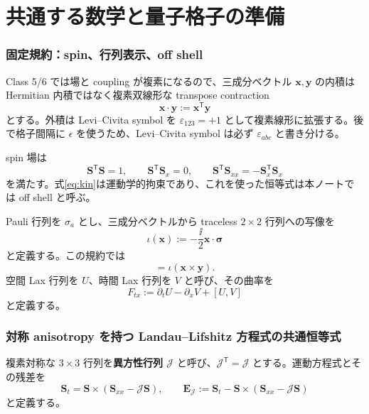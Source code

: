 \part{共通する数学と量子格子の準備}

\section{固定規約：spin、行列表示、off shell}
Class 5/6 では場と coupling が複素になるので、三成分ベクトル $\boldsymbol x,\boldsymbol y$ の内積は Hermitian 内積ではなく複素双線形な transpose contraction
\begin{equation}
\boldsymbol x\cdot\boldsymbol y:=\boldsymbol x^{\mathsf T}\boldsymbol y
\label{eq:dot}
\end{equation}
とする。外積は Levi--Civita symbol を $\varepsilon_{123}=+1$ として複素線形に拡張する。後で格子間隔に $\epsilon$ を使うため、Levi--Civita symbol は必ず $\varepsilon_{abc}$ と書き分ける。

spin 場は
\begin{equation}
\boldsymbol S^{\mathsf T}\boldsymbol S=1,
\qquad \boldsymbol S^{\mathsf T}\boldsymbol S_x=0,
\qquad \boldsymbol S^{\mathsf T}\boldsymbol S_{xx}=-\boldsymbol S_x^{\mathsf T}\boldsymbol S_x
\label{eq:kin}
\end{equation}
を満たす。式\eqref{eq:kin}は運動学的拘束であり、これを使った恒等式は本ノートでは off shell と呼ぶ。

Pauli 行列を $\sigma_a$ とし、三成分ベクトルから traceless $2\times2$ 行列への写像を
\begin{equation}
\iota(\boldsymbol x):=-\frac{\ii}{2}\boldsymbol x\cdot\boldsymbol\sigma
\label{eq:iota}
\end{equation}
と定義する。この規約では
\begin{equation}
[\iota(\boldsymbol x),\iota(\boldsymbol y)]=\iota(\boldsymbol x\times\boldsymbol y).
\label{eq:iotacomm}
\end{equation}
空間 Lax 行列を $U$、時間 Lax 行列を $V$ と呼び、その曲率を
\begin{equation}
F_{tx}:=\partial_tU-\partial_xV+[U,V]
\label{eq:curv}
\end{equation}
と定義する。

\section{対称 anisotropy を持つ Landau--Lifshitz 方程式の共通恒等式}
複素対称な $3\times3$ 行列を\textbf{異方性行列 $\mathcal J$} と呼び、$\mathcal J^{\mathsf T}=\mathcal J$ とする。運動方程式とその残差を
\begin{equation}
\boldsymbol S_t=\boldsymbol S\times(\boldsymbol S_{xx}-\mathcal J\boldsymbol S),\qquad
\boldsymbol E_{\mathcal J}:=\boldsymbol S_t-\boldsymbol S\times(\boldsymbol S_{xx}-\mathcal J\boldsymbol S)
\label{eq:genericLL}
\end{equation}
と定義する。

